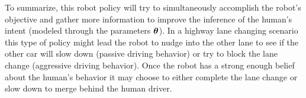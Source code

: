 To summarize, this robot policy will try to simultaneously accomplish the robot's objective and gather more information to improve the inference of the human's intent (modeled through the parameters $\bm{\theta}$). In a highway lane changing scenario this type of policy might lead the robot to nudge into the other lane to see if the other car will slow down (passive driving behavior) or try to block the lane change (aggressive driving behavior). Once the robot has a strong enough belief about the human's behavior it may choose to either complete the lane change or slow down to merge behind the human driver.
